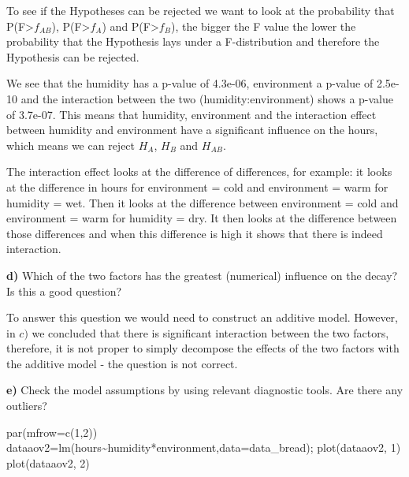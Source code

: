 \documentclass[
  10pt,
]{article}
\newenvironment{Shaded}{\begin{snugshade}}{\end{snugshade}}
\newcommand{\AttributeTok}[1]{\textcolor[rgb]{0.77,0.63,0.00}{#1}}
\newcommand{\DecValTok}[1]{\textcolor[rgb]{0.00,0.00,0.81}{#1}}
\newcommand{\FunctionTok}[1]{\textcolor[rgb]{0.00,0.00,0.00}{#1}}
\newcommand{\NormalTok}[1]{#1}
\newcommand{\OtherTok}[1]{\textcolor[rgb]{0.56,0.35,0.01}{#1}}
\newcommand{\SpecialCharTok}[1]{\textcolor[rgb]{0.00,0.00,0.00}{#1}}
\begin{document}
To see if the Hypotheses can be rejected we want to look at the
probability that P(F\textgreater{}\(f_{AB}\)),
P(F\textgreater{}\(f_{A}\)) and P(F\textgreater{}\(f_{B}\)), the bigger
the F value the lower the probability that the Hypothesis lays under a
F-distribution and therefore the Hypothesis can be rejected.

We see that the humidity has a p-value of 4.3e-06, environment a p-value
of 2.5e-10 and the interaction between the two (humidity:environment)
shows a p-value of 3.7e-07. This means that humidity, environment and
the interaction effect between humidity and environment have a
significant influence on the hours, which means we can reject \(H_{A}\),
\(H_{B}\) and \(H_{AB}\).

The interaction effect looks at the difference of differences, for
example: it looks at the difference in hours for environment = cold and
environment = warm for humidity = wet. Then it looks at the difference
between environment = cold and environment = warm for humidity = dry. It
then looks at the difference between those differences and when this
difference is high it shows that there is indeed interaction.

\textbf{d)} Which of the two factors has the greatest (numerical)
influence on the decay? Is this a good question?

To answer this question we would need to construct an additive model.
However, in \(c)\) we concluded that there is significant interaction
between the two factors, therefore, it is not proper to simply decompose
the effects of the two factors with the additive model - the question is
not correct.

\textbf{e)} Check the model assumptions by using relevant diagnostic
tools. Are there any outliers?

\begin{Shaded}
\begin{Highlighting}[]
\FunctionTok{par}\NormalTok{(}\AttributeTok{mfrow=}\FunctionTok{c}\NormalTok{(}\DecValTok{1}\NormalTok{,}\DecValTok{2}\NormalTok{))}
\NormalTok{dataaov2}\OtherTok{=}\FunctionTok{lm}\NormalTok{(hours}\SpecialCharTok{\textasciitilde{}}\NormalTok{humidity}\SpecialCharTok{*}\NormalTok{environment,}\AttributeTok{data=}\NormalTok{data\_bread); }
\FunctionTok{plot}\NormalTok{(dataaov2, }\DecValTok{1}\NormalTok{)}
\FunctionTok{plot}\NormalTok{(dataaov2, }\DecValTok{2}\NormalTok{)}
\end{Highlighting}
\end{Shaded}
\end{document}
